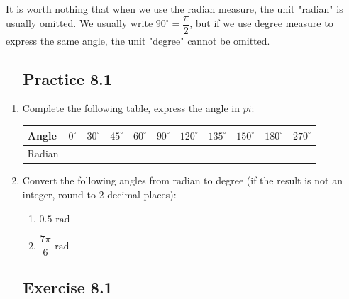 \documentclass{report}
\newcommand{\exercise}[1]{%
    \subsection*{\faPencil\ \ Exercise #1\hspace{0.5em}\xrfill[0.175\baselineskip]{1pt}}
}
\newcommand{\practice}[1]{%
    \subsection*{\faFlag\ \ Practice #1\hspace{0.5em}\xrfill[0.175\baselineskip]{1pt}}
}
\begin{document}
It is worth nothing that when we use the radian measure, the unit "radian" is usually omitted. We usually write $90^\circ = \dfrac{\pi}{2}$, but if we use degree measure to express the same angle, the unit "degree" cannot be omitted.

\practice{8.1}

\begin{enumerate}
    \item Complete the following table, express the angle in $pi$:
    
    \begin{tabular}{|l|c|c|c|c|c|c|c|c|c|c|}
        \hline Angle & $0^{\circ}$ & $30^{\circ}$ & $45^{\circ}$ & $60^{\circ}$ & $90^{\circ}$ & $120^{\circ}$ & $135^{\circ}$ & $150^{\circ}$ & $180^{\circ}$ & $270^{\circ}$ \\
        \hline Radian & & & & & & & & & & \\
        \hline
        \end{tabular}
        \vspace{1em}

        \item Convert the following angles from radian to degree (if the result is not an integer, round to 2 decimal places):
        \vspace{-1em}
        \begin{multicols}{2}
            \begin{enumerate}[label=(\alph*)]
                \item $0.5 \text{ rad}$
                \item $\dfrac{7\pi}{6} \text{ rad}$
            \end{enumerate}
        \end{multicols}
\end{enumerate}

\exercise{8.1}
\end{document}
